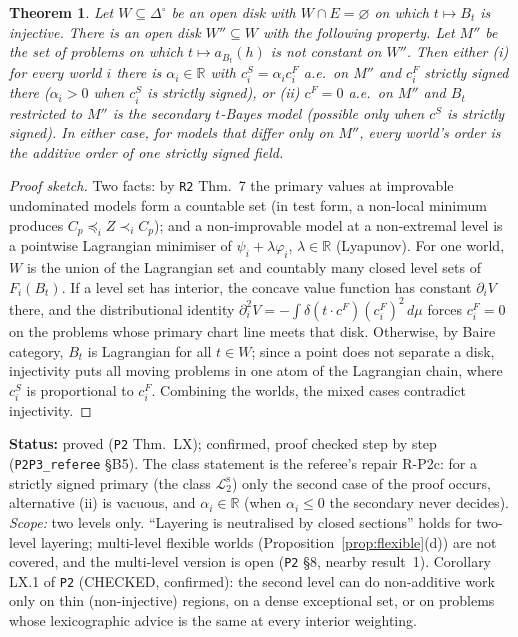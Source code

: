 \documentclass[11pt]{article}
\newtheorem{theorem}{Theorem}[section]
\theoremstyle{definition}
\theoremstyle{remark}
\newcommand{\R}{\mathbb R}
\newcommand{\Di}{\Delta^{\circ}}
\newcommand{\src}[1]{\texttt{#1}}
\newcommand{\status}[1]{\par\smallskip\noindent\textbf{Status:} #1\par\smallskip}
\newcommand{\Ltwo}{\mathcal L_2^{\mathrm s}}
\begin{document}
\begin{theorem}\label{thm:LX}
Let $W\subseteq\Di$ be an open disk with $W\cap E=\varnothing$ on which $t\mapsto B_t$ is injective. There is an open disk $W''\subseteq W$ with the following property. Let $M''$ be the set of problems on which $t\mapsto a_{B_t}(h)$ is not constant on $W''$. Then either (i) for every world $i$ there is $\alpha_i\in\R$ with $c^S_i=\alpha_ic^F_i$ a.e.\ on $M''$ and $c^F_i$ strictly signed there ($\alpha_i>0$ when $c^S_i$ is strictly signed), or (ii) $c^F=0$ a.e.\ on $M''$ and $B_t$ restricted to $M''$ is the secondary $t$-Bayes model (possible only when $c^S$ is strictly signed). In either case, for models that differ only on $M''$, every world's order is the additive order of one strictly signed field.
\end{theorem}
\begin{proof}[Proof sketch]
Two facts: by \src{R2} Thm.~7 the primary values at improvable undominated models form a countable set (in test form, a non-local minimum produces $C_p\preceq_iZ\prec_iC_p$); and a non-improvable model at a non-extremal level is a pointwise Lagrangian minimiser of $\psi_i+\lambda\varphi_i$, $\lambda\in\R$ (Lyapunov). For one world, $W$ is the union of the Lagrangian set and countably many closed level sets of $F_i(B_t)$. If a level set has interior, the concave value function has constant $\partial_iV$ there, and the distributional identity $\partial_i^2V=-\int\delta(t\cdot c^F)(c^F_i)^2\,d\mu$ forces $c^F_i=0$ on the problems whose primary chart line meets that disk. Otherwise, by Baire category, $B_t$ is Lagrangian for all $t\in W$; since a point does not separate a disk, injectivity puts all moving problems in one atom of the Lagrangian chain, where $c^S_i$ is proportional to $c^F_i$. Combining the worlds, the mixed cases contradict injectivity.
\end{proof}
\status{proved (\src{P2} Thm.~LX); confirmed, proof checked step by step (\src{P2P3\_referee} \S B5). The class statement is the referee's repair R-P2c: for a strictly signed primary (the class $\Ltwo$) only the second case of the proof occurs, alternative (ii) is vacuous, and $\alpha_i\in\R$ (when $\alpha_i\le0$ the secondary never decides). \emph{Scope:} two levels only. ``Layering is neutralised by closed sections'' holds for two-level layering; multi-level flexible worlds (Proposition~\ref{prop:flexible}(d)) are not covered, and the multi-level version is open (\src{P2} \S8, nearby result~1). Corollary LX.1 of \src{P2} (CHECKED, confirmed): the second level can do non-additive work only on thin (non-injective) regions, on a dense exceptional set, or on problems whose lexicographic advice is the same at every interior weighting.}
\end{document}
